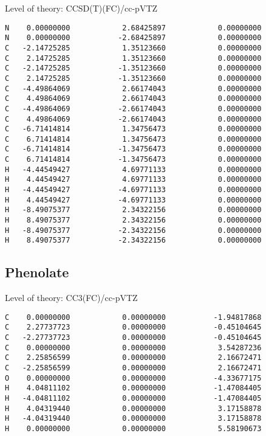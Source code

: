 \documentclass[journal=jctcce,manuscript=article,layout=traditional]{achemso}
\newcommand{\TZ}{cc-pVTZ}
\begin{document}
\begin{singlespace}
Level of theory: CCSD(T)(FC)/{\TZ}
\begin{verbatim}
N    0.00000000            2.68425897            0.00000000
N    0.00000000           -2.68425897            0.00000000
C   -2.14725285            1.35123660            0.00000000
C    2.14725285            1.35123660            0.00000000
C   -2.14725285           -1.35123660            0.00000000
C    2.14725285           -1.35123660            0.00000000
C   -4.49864069            2.66174043            0.00000000
C    4.49864069            2.66174043            0.00000000
C   -4.49864069           -2.66174043            0.00000000
C    4.49864069           -2.66174043            0.00000000
C   -6.71414814            1.34756473            0.00000000
C    6.71414814            1.34756473            0.00000000
C   -6.71414814           -1.34756473            0.00000000
C    6.71414814           -1.34756473            0.00000000
H   -4.44549427            4.69771133            0.00000000
H    4.44549427            4.69771133            0.00000000
H   -4.44549427           -4.69771133            0.00000000
H    4.44549427           -4.69771133            0.00000000
H   -8.49075377            2.34322156            0.00000000
H    8.49075377            2.34322156            0.00000000
H   -8.49075377           -2.34322156            0.00000000
H    8.49075377           -2.34322156            0.00000000
\end{verbatim}
\end{singlespace}

\subsection*{Phenolate}

\begin{singlespace}
Level of theory: CC3(FC)/{\TZ}
\begin{verbatim}
C    0.00000000            0.00000000           -1.94817868
C    2.27737723            0.00000000           -0.45104645
C   -2.27737723            0.00000000           -0.45104645
C    0.00000000            0.00000000            3.54287236
C    2.25856599            0.00000000            2.16672471
C   -2.25856599            0.00000000            2.16672471
O    0.00000000            0.00000000           -4.33677175
H    4.04811102            0.00000000           -1.47084405
H   -4.04811102            0.00000000           -1.47084405
H    4.04319440            0.00000000            3.17158878
H   -4.04319440            0.00000000            3.17158878
H    0.00000000            0.00000000            5.58190673
\end{verbatim}
\end{singlespace}
\end{document}
